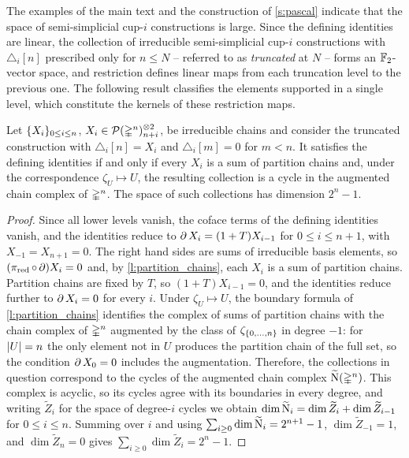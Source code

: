 \documentclass{amsart}
\begin{document}
The examples of the main text and the construction of \cref{s:pascal} indicate that the space of semi-simplicial \mbox{cup-$i$} constructions is large.
Since the defining identities are linear, the collection of irreducible semi-simplicial \mbox{cup-$i$} constructions with $\triangle_i[n]$ prescribed only for $n \leq N$ -- referred to as \emph{truncated} at $N$ -- forms an ${\mathbb{F}_2}$-vector space, and restriction defines linear maps from each truncation level to the previous one.
The following result classifies the elements supported in a single level, which constitute the kernels of these restriction maps.

\begin{proposition}\label{p:level_supported}
	Let $\{X_i\}_{0 \leq i \leq n}$, $X_i \in \mathcal{P}(\mathbb{\Delta}^n)^{\otimes 2}_{n+i}$, be irreducible chains and consider the truncated construction with $\triangle_i[n] = X_i$ and $\triangle_i[m] = 0$ for $m < n$.
	It satisfies the defining identities if and only if every $X_i$ is a sum of partition chains and, under the correspondence $\zeta_U \mapsto U$, the resulting collection is a cycle in the augmented chain complex of $\mathbb{\Delta}^n$.
	The space of such collections has dimension $2^n - 1$.
\end{proposition}

\begin{proof}
	Since all lower levels vanish, the coface terms of the defining identities vanish, and the identities reduce to $\operatorname{\partial} X_i = (1+T) X_{i-1}$ for $0 \leq i \leq n+1$, with $X_{-1} = X_{n+1} = 0$.
	The right hand sides are sums of irreducible basis elements, so $(\operatorname{\pi_{\text{red}}} \circ \operatorname{\partial}) X_i = 0$ and, by \cref{l:partition_chains}, each $X_i$ is a sum of partition chains.
	Partition chains are fixed by $T$, so $(1+T)X_{i-1} = 0$, and the identities reduce further to $\operatorname{\partial} X_i = 0$ for every $i$.
	Under $\zeta_U \mapsto U$, the boundary formula of \cref{l:partition_chains} identifies the complex of sums of partition chains with the chain complex of $\mathbb{\Delta}^n$ augmented by the class of $\zeta_{\{0, \dots, n\}}$ in degree $-1$: for $\lvert U\rvert = n$ the only element not in $U$ produces the partition chain of the full set, so the condition $\operatorname{\partial} X_0 = 0$ includes the augmentation.
	Therefore, the collections in question correspond to the cycles of the augmented chain complex $\widetilde{\operatorname{N}}(\mathbb{\Delta}^n)$.
	This complex is acyclic, so its cycles agree with its boundaries in every degree, and writing $\widetilde{Z}_i$ for the space of degree-$i$ cycles we obtain $\dim \widetilde{\operatorname{N}}_i = \dim \widetilde{Z}_i + \dim \widetilde{Z}_{i-1}$ for $0 \leq i \leq n$.
	Summing over $i$ and using $\sum_{i \geq 0} \dim \widetilde{\operatorname{N}}_i = 2^{n+1} - 1$, $\dim \widetilde{Z}_{-1} = 1$, and $\dim \widetilde{Z}_n = 0$ gives $\sum_{i \geq 0} \dim \widetilde{Z}_i = 2^n - 1$.
\end{proof}
\end{document}
